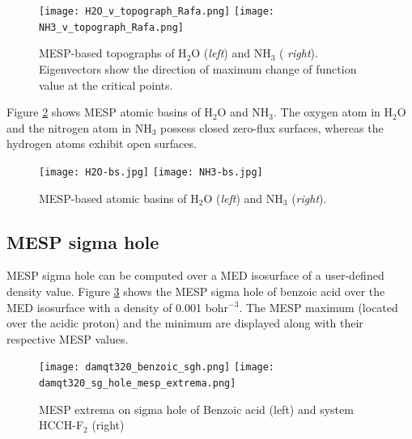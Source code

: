 \documentclass[10pt]{article}
\begin{document}
\begin{figure}[H]
\begin{center}
\texttt{[image: H2O\_v\_topograph\_Rafa.png]}
\hspace*{5mm}
\texttt{[image: NH3\_v\_topograph\_Rafa.png]}
\end{center}
\caption[MESP topographs of H$_2$O and NH$_3$]{MESP-based topographs of H$_2$O ({\it left}) and NH$_3$ ({\it
right}). Eigenvectors show the direction of maximum change of function value at the critical points.
\label{fig:6_5_2}}
\end{figure}

Figure \ref{fig:6_5_3} shows MESP atomic basins of H$_2$O and NH$_3$. The oxygen atom in H$_2$O and the nitrogen atom in NH$_3$ 
possess closed zero-flux surfaces, whereas the hydrogen atoms exhibit open surfaces.
 
  
\begin{figure}[H]
\begin{center}
\texttt{[image: H2O-bs.jpg]}
\hspace*{5mm}
\texttt{[image: NH3-bs.jpg]}
\end{center}
\caption[MESP atomic basins of H$_2$O and NH$_3$]{MESP-based atomic basins of H$_2$O ({\it left}) and NH$_3$ ({\it right}).
\label{fig:6_5_3}}
\end{figure}

\subsection{MESP sigma hole \label{sec:6.6} }

MESP sigma hole can be computed over a MED isosurface of a user-defined density value. Figure \ref{fig:6_6_1} shows the
MESP sigma hole of benzoic acid over the MED isosurface with a density of
0.001 bohr$^{-3}$. The MESP maximum (located over the acidic proton) and the minimum 
are displayed along with their respective MESP values.


\vspace*{5mm}
\begin{figure}[H]
\begin{center}
\hspace*{5mm}
\texttt{[image: damqt320\_benzoic\_sgh.png]}
\hspace*{5mm}
\texttt{[image: damqt320\_sg\_hole\_mesp\_extrema.png]}
\end{center}
\caption[MESP extrema on sigma hole]{ MESP extrema on sigma hole of Benzoic acid (left)
and system HCCH-F$_2$ (right)
\label{fig:6_6_1}}
\end{figure}
\end{document}
